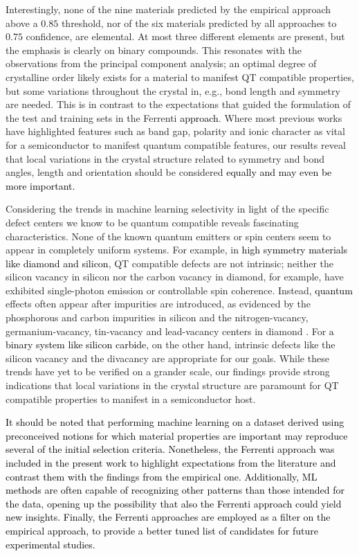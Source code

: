\documentclass[superscriptaddress,unsortedaddress,
 amsmath,amssymb,
 aps,
]{revtex4-2}
\newcommand{\mrk}[1]{\textcolor{black}{#1}}
\begin{document}
Interestingly, none of the nine materials predicted by the empirical approach above a $0.85$ threshold, nor of the six materials predicted by all approaches to $0.75$ confidence, are elemental. At most three different elements are present, but the emphasis is clearly on binary compounds. This resonates with the observations from the principal component analysis; an optimal degree of crystalline order likely exists for a material to manifest QT compatible properties, but some variations throughout the crystal in, e.g., bond length and symmetry are needed. This is in contrast to the expectations that guided the formulation of the test and training sets in the Ferrenti \mrk{approach}. Where most previous works have highlighted features such as band gap, polarity and ionic character as vital for a semiconductor to manifest quantum compatible features, our results reveal that local variations in the crystal structure related to symmetry and bond angles, length and orientation should be considered \mrk{equally and may even be more important.} 

Considering the trends in machine learning selectivity in light of the specific defect centers we know to be quantum compatible reveals fascinating characteristics. None of the known quantum emitters or spin centers seem to appear in completely uniform systems. For example, in \mrk{high symmetry materials like diamond and silicon}, QT compatible defects are not intrinsic; neither the silicon vacancy in silicon nor the carbon vacancy in diamond, for example,  have exhibited single-photon emission or controllable spin coherence. Instead, \mrk{quantum} effects often appear after impurities are introduced, as evidenced by the phosphorous and carbon impurities in silicon \cite{He2019,Redjem2020} and the nitrogen-vacancy, germanium-vacancy, tin-vacancy and lead-vacancy centers in diamond \cite{Thiering2020}. 
For \mrk{a binary system like silicon carbide}, on the other hand, intrinsic defects like the silicon vacancy and the divacancy are appropriate for our goals. 
While these trends have yet to be verified on a grander scale, our findings provide strong indications that local variations in the crystal structure are paramount for QT compatible properties to manifest in a semiconductor host. 

\mrk{It should be noted that performing machine learning on a dataset derived using preconceived notions for which material properties are important may reproduce several of the initial selection criteria. Nonetheless, the Ferrenti approach was included in the present work to highlight expectations from the literature and contrast them with the findings from the empirical one. Additionally, ML methods are often capable of recognizing other patterns than those intended for the data, opening up the possibility that also the Ferrenti approach could yield new insights. Finally, the Ferrenti approaches are employed as a filter on the empirical approach, to provide a better tuned list of candidates for future experimental studies.} 
\end{document}
